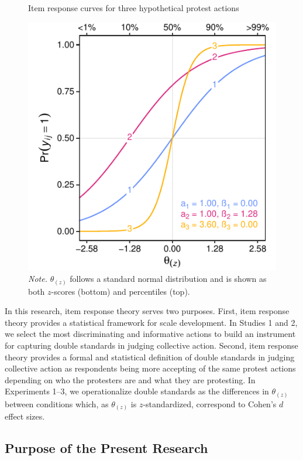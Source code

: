 \documentclass[12pt, letterpaper]{article}
\begin{document}
\begin{figure}
\centering
\caption{Item response curves for three hypothetical protest actions}
\includegraphics[scale=1]{../Scale Development/figures/figure-1}
\caption*{\textit{Note.} $\theta_{(z)}$ follows a standard normal distribution and is shown as both $z$-scores (bottom) and percentiles (top).}
\label{fig:f1}
\end{figure}

In this research, item response theory serves two purposes. First, item
response theory provides a statistical framework for scale development.
In Studies 1 and 2, we select the most discriminating and informative
actions to build an instrument for capturing double standards in judging
collective action. Second, item response theory provides a formal and
statistical definition of double standards in judging collective action
as respondents being more accepting of the same protest actions
depending on who the protesters are and what they are protesting. In
Experiments 1--3, we operationalize double standards as the differences
in \(\theta_{(z)}\) between conditions which, as \(\theta_{(z)}\) is
\(z\)-standardized, correspond to Cohen's \(d\) effect sizes.

\hypertarget{purpose-of-the-present-research}{%
\subsection{Purpose of the Present
Research}\label{purpose-of-the-present-research}}
\end{document}
